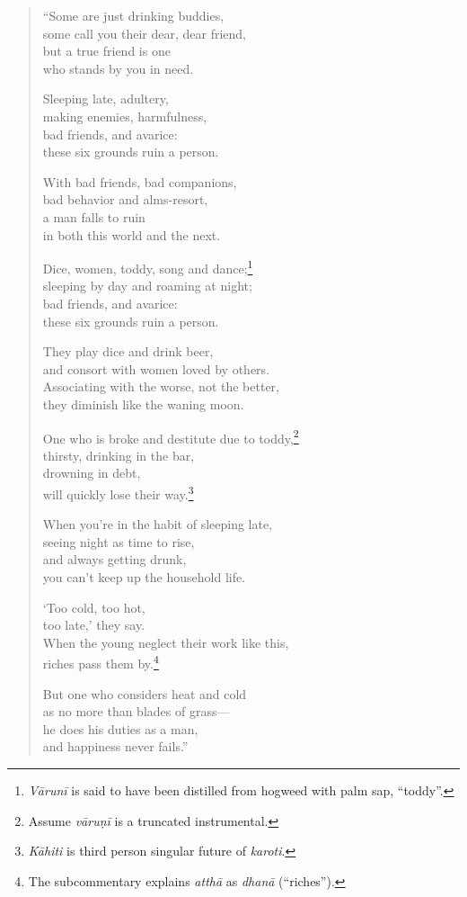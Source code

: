 \documentclass[12pt,openany]{book}%
\begin{document}
\begin{verse}%
“Some are just drinking buddies, \\
some call you their dear, dear friend, \\
but a true friend is one \\
who stands by you in need. 

Sleeping late, adultery, \\
making enemies, harmfulness, \\
bad friends, and avarice: \\
these six grounds ruin a person. 

With bad friends, bad companions, \\
bad behavior and alms-resort, \\
a man falls to ruin \\
in both this world and the next. 

Dice, women, toddy, song and dance;\footnote{\textit{\textsanskrit{Vārunī}} is said to have been distilled from hogweed with palm sap, “toddy”. } \\
sleeping by day and roaming at night; \\
bad friends, and avarice: \\
these six grounds ruin a person. 

They play dice and drink beer, \\
and consort with women loved by others. \\
Associating with the worse, not the better, \\
they diminish like the waning moon. 

One who is broke and destitute due to toddy,\footnote{Assume \textit{\textsanskrit{vāruṇī}} is a truncated instrumental. } \\
thirsty, drinking in the bar, \\
drowning in debt, \\
will quickly lose their way.\footnote{\textit{\textsanskrit{Kāhiti}} is third person singular future of \textit{karoti}. } 

When you’re in the habit of sleeping late, \\
seeing night as time to rise, \\
and always getting drunk, \\
you can’t keep up the household life. 

‘Too cold, too hot, \\
too late,’ they say. \\
When the young neglect their work like this, \\
riches pass them by.\footnote{The subcommentary explains \textit{\textsanskrit{atthā}} as \textit{\textsanskrit{dhanā}} (“riches”). } 

But one who considers heat and cold \\
as no more than blades of grass—\\
he does his duties as a man, \\
and happiness never fails.” 

%
\end{verse}
\end{document}

